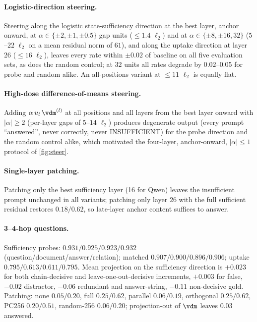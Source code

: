 \paragraph{Logistic-direction steering.} Steering along the logistic state-sufficiency direction at the best layer, anchor onward, at $\alpha\in\{\pm2,\pm1,\pm0.5\}$ gap units ($\le1.4$ $\ell_2$) and at $\alpha\in\{\pm8,\pm16,32\}$ ($5$--$22$ $\ell_2$ on a mean residual norm of $61$), and along the uptake direction at layer 26 ($\le16$ $\ell_2$), leaves every rate within $\pm0.02$ of baseline on all five evaluation sets, as does the random control; at $32$ units all rates degrade by $0.02$--$0.05$ for probe and random alike. An all-positions variant at $\le11$ $\ell_2$ is equally flat.

\paragraph{High-dose difference-of-means steering.} Adding $\alpha\,u_l\,\vdm^{(l)}$ at all positions and all layers from the best layer onward with $|\alpha|\ge2$ (per-layer gaps of $5$--$14$ $\ell_2$) produces degenerate output (every prompt ``answered'', never correctly, never INSUFFICIENT) for the probe direction and the random control alike, which motivated the four-layer, anchor-onward, $|\alpha|\le1$ protocol of \cref{fig:steer}.

\paragraph{Single-layer patching.} Patching only the best sufficiency layer (16 for Qwen) leaves the insufficient prompt unchanged in all variants; patching only layer 26 with the full sufficient residual restores $0.18/0.62$, so late-layer anchor content suffices to answer.

\paragraph{3--4-hop questions.} Sufficiency probes: $0.931/0.925/0.923/0.932$ (question/document/answer/relation); matched $0.907/0.900/0.896/0.906$; uptake $0.795/0.613/0.611/0.795$. Mean projection on the sufficiency direction is $+0.023$ for both chain-decisive and leave-one-out-decisive increments, $+0.003$ for false, $-0.02$ distractor, $-0.06$ redundant and answer-string, $-0.11$ non-decisive gold. Patching: none $0.05/0.20$, full $0.25/0.62$, parallel $0.06/0.19$, orthogonal $0.25/0.62$, PC256 $0.20/0.51$, random-256 $0.06/0.20$; projection-out of $\vdm$ leaves $0.03$ answered.

